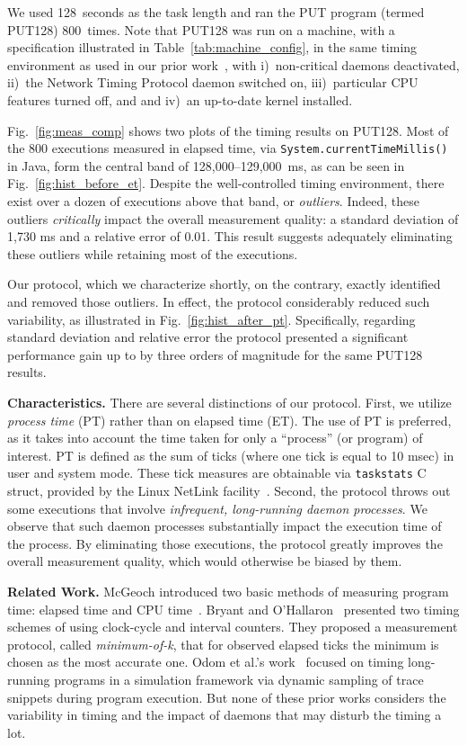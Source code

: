 \documentclass[letter]{ieice}
\begin{document}
We used 128~seconds as the task length and ran the PUT program (termed PUT128) 
800~times. {\color{red}Note that PUT128 was run on a machine, with 
a specification illustrated in Table~\ref{tab:machine_config}, 
in the same timing environment as used in our prior work~\cite{Currim}, 
with i)~non-critical daemons deactivated, 
ii)~the Network Timing Protocol daemon switched on,  
iii)~particular CPU features\cite{intel15,intelSpeed15} turned off, and 
and iv)~an up-to-date kernel installed.} 

{\color{blue}Fig.~\ref{fig:meas_comp} shows two plots of the timing results on PUT128.
Most of the 800 executions measured in elapsed time, 
via  {\tt System.currentTimeMillis()} in Java, form the central band 
of \hbox{128,000--129,000 ms,} as can be seen in Fig.~\ref{fig:hist_before_et}. 
Despite the well-controlled timing environment, there exist over a dozen of executions above that band, or {\em outliers}. Indeed, these outliers {\em critically} impact the overall measurement quality: a standard deviation of 1,730 ms and a relative error of 0.01. This result suggests adequately eliminating these outliers while retaining most of the executions.}

{\color{blue}
Our protocol, which we characterize shortly, on the contrary, 
exactly identified and removed those outliers. 
In effect, the protocol considerably reduced such variability, 
as illustrated in Fig.~\ref{fig:hist_after_pt}. 
Specifically, regarding standard deviation and relative error 
the protocol presented a significant performance gain up to by 
three orders of magnitude for the same PUT128 results.
}

{\color{red}
{\bf Characteristics.} There are several distinctions of our protocol. 
First, we utilize {\em process time} (PT) rather than on elapsed time (ET). 
The use of PT is preferred, as it takes into account 
the time taken for only a ``process'' (or program) of interest.
PT is defined as the sum of ticks (where one tick is equal to 10 msec)
in user and system mode. 
These tick measures are obtainable via {\tt taskstats} C struct, 
provided by the Linux NetLink facility~\cite{Netlink}. 
Second, the protocol throws out some executions that involve
{\em infrequent, \hbox{long-running} daemon processes}. 
We observe that such daemon processes substantially impact 
the execution time of the process.  
By eliminating those executions, the protocol greatly improves
the overall measurement quality, which would otherwise be biased by them.
}

{\bf Related Work.} 
McGeoch introduced
two basic methods of measuring program time: elapsed time and CPU time~\cite{Mcgeoch12}. 
Bryant and O'Hallaron~\cite{Randal03} 
presented two timing schemes of using clock-cycle and interval counters. 
They proposed a measurement protocol, called {\em minimum-of-k}, 
that for observed elapsed ticks the minimum is chosen as the most accurate one. 
Odom et al.'s work~\cite{Odom05} focused on timing long-running programs 
in a simulation framework via dynamic sampling of trace snippets during program execution. 
But none of these prior works considers the variability in 
timing and the impact of daemons that may disturb the timing a lot.
\end{document}
